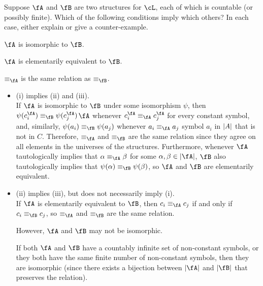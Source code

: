 \begin{problem}
  Suppose $\fA$ and $\fB$ are two structures for $\cL$, each of which is
  countable (or possibly finite).
  Which of the following conditions imply which others?
  In each case, either explain or give a counter-example.
  \begin{enumroman}
    \item $\fA$ is isomorphic to $\fB$.
    \item $\fA$ is elementarily equivalent to $\fB$.
    \item $\equiv_\fA$ is the same relation as $\equiv_\fB$.
  \end{enumroman}
\end{problem}
\begin{Answer}
  \begin{itemize}
    \item (i) implies (ii) and (iii).\\
      If $\fA$ is isomorphic to $\fB$ under some isomorphism $\psi$,
      then $\psi(c_i^\fA) \equiv_\fB \psi(c_j^\fA)$$\fA$ whenever
      $c_i^\fA \equiv_\fA c_j^\fA$ for every constant symbol,
      and, similarly, $\psi(a_i) \equiv_\fB \psi(a_j)$ whenever
      $a_i \equiv_\fA a_j$ symbol $a_i$ in $\lvert A\rvert$ that is not in $C$.
      Therefore, $\equiv_\fA$ and $\equiv_\fB$ are the same relation
      since they agree on all elements in the universes of the structures.
      Furthermore, whenever $\fA$ tautologically implies that
      $\alpha \equiv_\fA \beta$ for some $\alpha, \beta \in \abs{\fA}$,
      $\fB$ also tautologically implies that
      $\psi(\alpha) \equiv_\fB \psi(\beta)$, so $\fA$ and $\fB$ are
      elementarily equivalent.
    \item (ii) implies (iii), but does not necessarily imply (i).\\
      If $\fA$ is elementarily equivalent to $\fB$, then
      $c_i \equiv_\fA c_j$ if and only if $c_i \equiv_\fB c_j$,
      so $\equiv_\fA$ and $\equiv_\fB$ are the same relation.

      However, $\fA$ and $\fB$ may not be isomorphic.

      \step
      If both $\fA$ and $\fB$ have a countably infinite set of non-constant
      symbols, or they both have the same finite number of non-constant symbols,
      then they are isomorphic (since there exists a bijection between
      $\abs{\fA}$ and $\abs{\fB}$ that preserves the relation).


\end{itemize}
\end{Answer}
